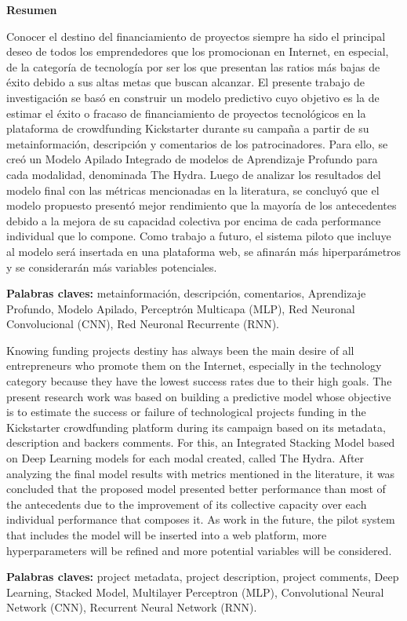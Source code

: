 \thispagestyle{plain}
\begin{center}
	{\Large \bfseries  Resumen}
\end{center}
\vspace{0.5cm}

Conocer el destino del financiamiento de proyectos siempre ha sido el principal deseo de todos los emprendedores que los promocionan en Internet, en especial, de la categoría de tecnología por ser los que presentan las ratios más bajas de éxito debido a sus altas metas que buscan alcanzar. El presente trabajo de investigación se basó en construir un modelo predictivo cuyo objetivo es la de estimar el éxito o fracaso de financiamiento de proyectos tecnológicos en la plataforma de crowdfunding Kickstarter durante su campaña a partir de su metainformación, descripción y comentarios de los patrocinadores. Para ello, se creó un Modelo Apilado Integrado de modelos de Aprendizaje Profundo para cada modalidad, denominada The Hydra. Luego de analizar los resultados del modelo final con las métricas mencionadas en la literatura, se concluyó que el modelo propuesto presentó mejor rendimiento que la mayoría de los antecedentes debido a la mejora de su capacidad colectiva por encima de cada performance individual que lo compone. Como trabajo a futuro, el sistema piloto que incluye al modelo será insertada en una plataforma web, se afinarán más hiperparámetros y se considerarán más variables potenciales.

\textbf{Palabras claves: } metainformación, descripción, comentarios, Aprendizaje Profundo, Modelo Apilado, Perceptrón Multicapa (MLP), Red Neuronal Convolucional (CNN), Red Neuronal Recurrente (RNN).

\vspace{0.5cm}
Knowing funding projects destiny has always been the main desire of all entrepreneurs who promote them on the Internet, especially in the technology category because they have the lowest success rates due to their high goals. The present research work was based on building a predictive model whose objective is to estimate the success or failure of technological projects funding in the Kickstarter crowdfunding platform during its campaign based on its metadata, description and backers comments. For this, an Integrated Stacking Model based on Deep Learning models for each modal created, called The Hydra. After analyzing the final model results with metrics mentioned in the literature, it was concluded that the proposed model presented better performance than most of the antecedents due to the improvement of its collective capacity over each individual performance that composes it. As work in the future, the pilot system that includes the model will be inserted into a web platform, more hyperparameters will be refined and more potential variables will be considered.

\textbf{Palabras claves: } project metadata, project description, project comments, Deep Learning, Stacked Model, Multilayer Perceptron (MLP), Convolutional Neural Network (CNN), Recurrent Neural Network (RNN).